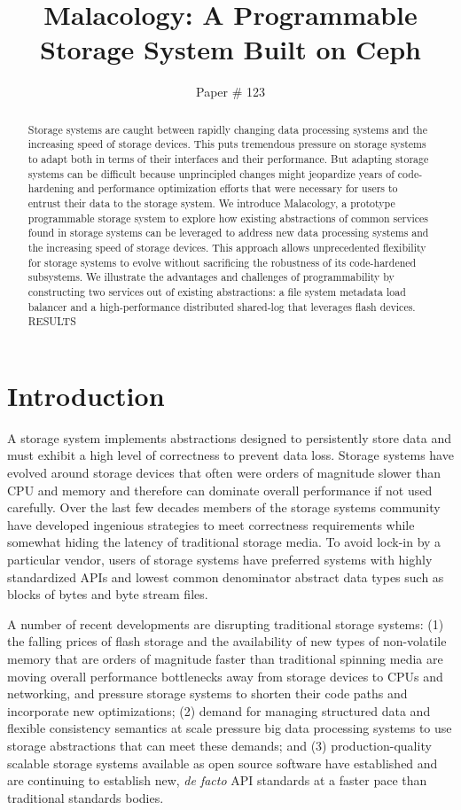 \documentclass[10pt,twocolumn]{article}
\title{Malacology: A Programmable Storage System Built on Ceph}
\author{Paper \# 123}
\date{}
\begin{document}
\maketitle

\begin{abstract}
Storage systems are caught between rapidly changing data processing systems and
the increasing speed of storage devices. This puts tremendous pressure on
storage systems to adapt both in terms of their interfaces and their
performance. But adapting storage systems can be difficult because unprincipled
changes might jeopardize years of code-hardening and performance optimization
efforts that were necessary for users to entrust their data to the storage
system.  We introduce  Malacology, a prototype programmable storage system to
explore how existing abstractions of common services found in storage systems
can be leveraged to address new data processing systems and the increasing
speed of storage devices. This approach allows unprecedented flexibility for
storage systems to evolve without sacrificing the robustness of its
code-hardened subsystems.  We illustrate the advantages and challenges of
programmability by constructing two services out of existing abstractions: a
file system metadata load balancer and a high-performance distributed shared-log
that leverages flash devices.  RESULTS
\end{abstract}

\section{Introduction}\label{introduction}

A storage system implements abstractions designed to persistently store
data and must exhibit a high level of correctness to prevent data loss.
Storage systems have evolved around storage devices that often were
orders of magnitude slower than CPU and memory and therefore can
dominate overall performance if not used carefully. Over the last few
decades members of the storage systems community have developed
ingenious strategies to meet correctness requirements while somewhat
hiding the latency of traditional storage media. To avoid lock-in by a
particular vendor, users of storage systems have preferred systems with
highly standardized APIs and lowest common denominator abstract data
types such as blocks of bytes and byte stream files.

A number of recent developments are disrupting traditional storage
systems: (1) the falling prices of flash storage and the availability of
new types of non-volatile memory that are orders of magnitude faster
than traditional spinning media are moving overall performance
bottlenecks away from storage devices to CPUs and networking, and
pressure storage systems to shorten their code paths and incorporate new
optimizations; (2) demand for managing structured data and flexible
consistency semantics at scale pressure big data processing systems to
use storage abstractions that can meet these demands; and (3)
production-quality scalable storage systems available as open source
software have established and are continuing to establish new, \emph{de
facto} API standards at a faster pace than traditional standards bodies.
\end{document}
